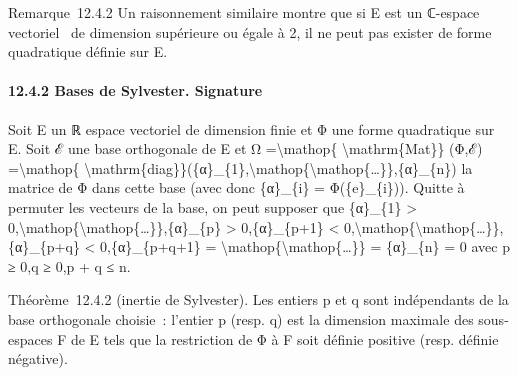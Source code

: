 \documentclass[]{article}
\begin{document}
Remarque~12.4.2 Un raisonnement similaire montre que si E est un
ℂ-espace vectoriel ~de dimension supérieure ou égale à 2, il ne peut pas
exister de forme quadratique définie sur E.

\paragraph{12.4.2 Bases de Sylvester. Signature}

Soit E un ℝ espace vectoriel de dimension finie et Φ une forme
quadratique sur E. Soit ℰ une base orthogonale de E et Ω
=\textbackslash{}mathop\{ \textbackslash{}mathrm\{Mat\}\} (Φ,ℰ)
=\textbackslash{}mathop\{
\textbackslash{}mathrm\{diag\}\}(\{α\}\_\{1\},\textbackslash{}mathop\{\textbackslash{}mathop\{\ldots{}\}\},\{α\}\_\{n\})
la matrice de Φ dans cette base (avec donc \{α\}\_\{i\} =
Φ(\{e\}\_\{i\})). Quitte à permuter les vecteurs de la base, on peut
supposer que \{α\}\_\{1\} \textgreater{}
0,\textbackslash{}mathop\{\textbackslash{}mathop\{\ldots{}\}\},\{α\}\_\{p\}
\textgreater{} 0,\{α\}\_\{p+1\} \textless{}
0,\textbackslash{}mathop\{\textbackslash{}mathop\{\ldots{}\}\},\{α\}\_\{p+q\}
\textless{} 0,\{α\}\_\{p+q+1\} =
\textbackslash{}mathop\{\textbackslash{}mathop\{\ldots{}\}\} =
\{α\}\_\{n\} = 0 avec p ≥ 0,q ≥ 0,p + q ≤ n.

Théorème~12.4.2 (inertie de Sylvester). Les entiers p et q sont
indépendants de la base orthogonale choisie~: l'entier p (resp. q) est
la dimension maximale des sous-espaces F de E tels que la restriction de
Φ à F soit définie positive (resp. définie négative).
\end{document}

